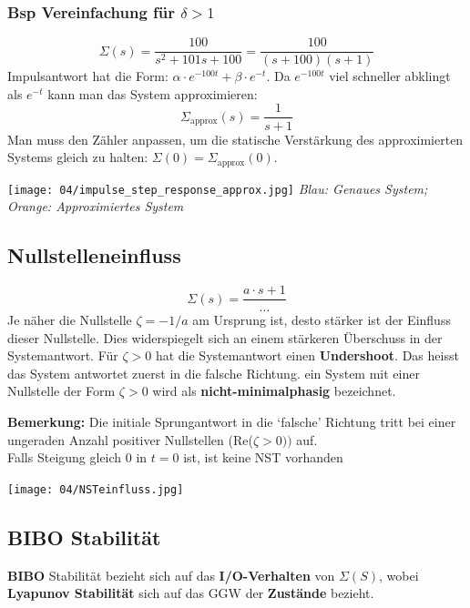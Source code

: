        \subsubsection{Bsp Vereinfachung für $\delta>1$}
            \[\Sigma(s)= \frac{100}{s^2+101s+100}= \frac{100}{(s+100)(s+1)}\]
            Impulsantwort hat die Form: $\alpha\cdot e^{-100t}+\beta\cdot e^{-t}$. Da $e^{-100t}$ viel schneller abklingt als $e^{-t}$ kann man das System approximieren:
            \[\Sigma_{\textrm{approx}}(s)=\frac{1}{s+1}\]
            Man muss den Zähler anpassen, um die statische Verstärkung des approximierten Systems gleich zu halten: $\Sigma(0)= \Sigma_{\textrm{approx}}(0)$.
            \begin{center}
                \texttt{[image: 04/impulse\_step\_response\_approx.jpg]}
                \textit{Blau: Genaues System; Orange: Approximiertes System}
            \end{center}
        
        \subsection{Nullstelleneinfluss}
        \[\Sigma(s)=\frac{a\cdot s+1}{\dots}\]
        Je näher die Nullstelle $\zeta = -1/a$ am Ursprung ist, desto stärker ist der Einfluss dieser Nullstelle. Dies widerspiegelt sich an einem stärkeren Überschuss in der Systemantwort. 
        Für $\zeta > 0 $ hat die Systemantwort einen \textbf{Undershoot}. Das heisst das System antwortet zuerst in die falsche Richtung. ein System mit einer Nullstelle der Form $\zeta > 0$ wird als \textbf{nicht-minimalphasig} bezeichnet.
        
        \textbf{Bemerkung:}
        Die initiale Sprungantwort in die `falsche' Richtung tritt bei einer ungeraden Anzahl positiver Nullstellen (Re($\zeta > 0))$ auf.
        \\Falls Steigung gleich 0 in $t=0$ ist, ist keine NST vorhanden
        
        \begin{center}
            \texttt{[image: 04/NSTeinfluss.jpg]}
        \end{center}
        
    \subsection{BIBO Stabilität}
        \textbf{BIBO} Stabilität bezieht sich auf das \textbf{I/O-Verhalten} von $\Sigma(S)$, wobei \textbf{Lyapunov Stabilität} sich auf das GGW der \textbf{Zustände} bezieht. 
        
